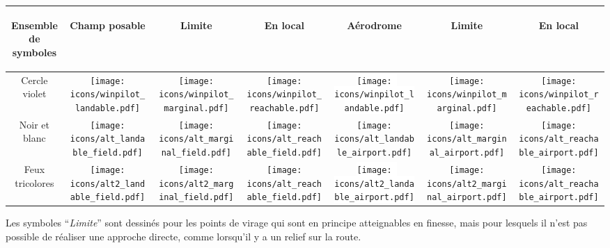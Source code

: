 \begin{tabular}{c|ccc|ccc|}
\begin{sideways}Ensemble de symboles\end{sideways}
&\begin{sideways}Champ posable\end{sideways}
&\begin{sideways}Limite\end{sideways}
&\begin{sideways}En local\end{sideways}
&\begin{sideways}Aérodrome\end{sideways}
&\begin{sideways}Limite\end{sideways}
&\begin{sideways}En local\end{sideways}\\
\hline
Cercle violet &
\texttt{[image: icons/winpilot\_landable.pdf]} &
\texttt{[image: icons/winpilot\_marginal.pdf]} &
\texttt{[image: icons/winpilot\_reachable.pdf]} &
\colorbox{white}{\texttt{[image: icons/winpilot\_landable.pdf]}} &
\texttt{[image: icons/winpilot\_marginal.pdf]} &
\texttt{[image: icons/winpilot\_reachable.pdf]} \\
\hline
Noir et blanc & 
\texttt{[image: icons/alt\_landable\_field.pdf]} &
\texttt{[image: icons/alt\_marginal\_field.pdf]} &
\texttt{[image: icons/alt\_reachable\_field.pdf]} &
\colorbox[rgb]{0.94,0.94,0.94}{\texttt{[image: icons/alt\_landable\_airport.pdf]}} &
\texttt{[image: icons/alt\_marginal\_airport.pdf]} &
\texttt{[image: icons/alt\_reachable\_airport.pdf]} \\
\hline
Feux tricolores & 
\texttt{[image: icons/alt2\_landable\_field.pdf]} &
\texttt{[image: icons/alt2\_marginal\_field.pdf]} &
\texttt{[image: icons/alt\_reachable\_field.pdf]} &
\colorbox{white}{\texttt{[image: icons/alt2\_landable\_airport.pdf]}} &
\texttt{[image: icons/alt2\_marginal\_airport.pdf]} &
\texttt{[image: icons/alt\_reachable\_airport.pdf]} \\
\hline
\end{tabular}

Les symboles ``\emph{Limite}'' sont dessinés pour les points de virage qui sont en principe atteignables
en finesse, mais pour lesquels il n'est pas possible de réaliser une approche directe, comme
lorsqu'il y a un relief sur la route.
 
